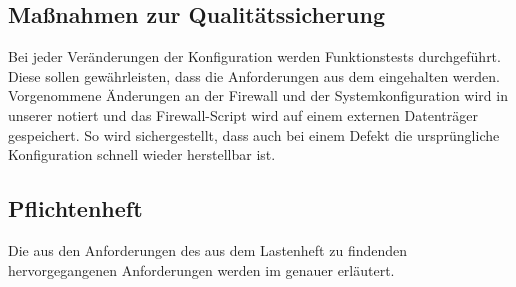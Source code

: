 \subsection{Maßnahmen zur Qualitätssicherung}
\label{sec:Qualitaetssicherung}
Bei jeder Veränderungen der Konfiguration werden Funktionstests durchgeführt. Diese sollen gewährleisten, dass die Anforderungen aus dem  eingehalten werden. Vorgenommene Änderungen an der Firewall und der Systemkonfiguration wird in unserer  notiert und das Firewall-Script wird auf einem externen Datenträger gespeichert. So wird sichergestellt, dass auch bei einem Defekt die ursprüngliche Konfiguration schnell wieder herstellbar ist.

\subsection{Pflichtenheft}
\label{sec:Pflichtenheft}
Die aus den Anforderungen des aus dem Lastenheft  zu findenden hervorgegangenen Anforderungen werden im  genauer erläutert.



